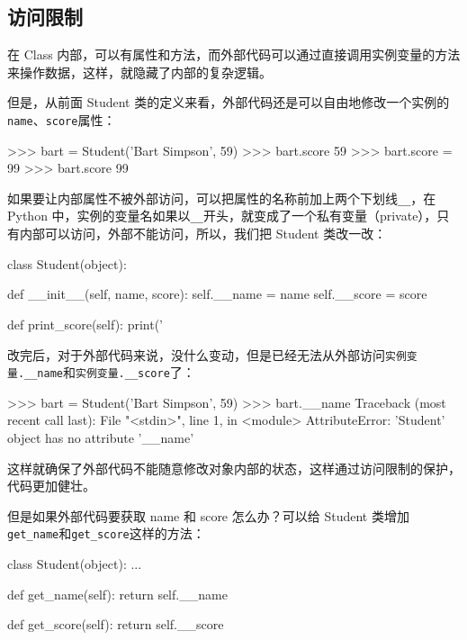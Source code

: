 \hypertarget{ux8bbfux95eeux9650ux5236}{%
\subsection{访问限制}\label{ux8bbfux95eeux9650ux5236}}

在 Class
内部，可以有属性和方法，而外部代码可以通过直接调用实例变量的方法来操作数据，这样，就隐藏了内部的复杂逻辑。

但是，从前面 Student
类的定义来看，外部代码还是可以自由地修改一个实例的\texttt{name}、\texttt{score}属性：

\begin{pythoncode}
>>> bart = Student('Bart Simpson', 59)
>>> bart.score
59
>>> bart.score = 99
>>> bart.score
99
\end{pythoncode}

如果要让内部属性不被外部访问，可以把属性的名称前加上两个下划线\texttt{\_\_}，在
Python
中，实例的变量名如果以\texttt{\_\_}开头，就变成了一个私有变量（private），只有内部可以访问，外部不能访问，所以，我们把
Student 类改一改：

\begin{pythoncode}
class Student(object):

    def __init__(self, name, score):
        self.__name = name
        self.__score = score

    def print_score(self):
        print('%
\end{pythoncode}

改完后，对于外部代码来说，没什么变动，但是已经无法从外部访问\texttt{实例变量.\_\_name}和\texttt{实例变量.\_\_score}了：

\begin{pythoncode}
>>> bart = Student('Bart Simpson', 59)
>>> bart.__name
Traceback (most recent call last):
  File "<stdin>", line 1, in <module>
AttributeError: 'Student' object has no attribute '__name'
\end{pythoncode}

这样就确保了外部代码不能随意修改对象内部的状态，这样通过访问限制的保护，代码更加健壮。

但是如果外部代码要获取 name 和 score 怎么办？可以给 Student
类增加\texttt{get\_name}和\texttt{get\_score}这样的方法：

\begin{pythoncode}
class Student(object):
    ...

    def get_name(self):
        return self.__name

    def get_score(self):
        return self.__score
\end{pythoncode}

